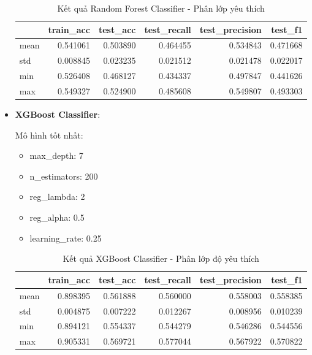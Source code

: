 \begin{itemize}
            \begin{table}[htbp]
                \centering
                \caption{Kết quả Random Forest Classifier - Phân lớp yêu thích}
                \label{tab:mal-fav-RF}
                \begin{tabular}{lrrrrr}
                    \hline
                     & train\_acc & test\_acc & test\_recall & test\_precision & test\_f1 \\
                    \hline
                    mean & 0.541061 & 0.503890 & 0.464455 & 0.534843 & 0.471668 \\
                    std & 0.008845 & 0.023235 & 0.021512 & 0.021478 & 0.022017 \\
                    min & 0.526408 & 0.468127 & 0.434337 & 0.497847 & 0.441626 \\
                    max & 0.549327 & 0.524900 & 0.485608 & 0.549807 & 0.493303 \\
                    \hline
                \end{tabular}
            \end{table}
            
            \FloatBarrier

        \item \textbf{XGBoost Classifier}:
        
            Mô hình tốt nhất:
            \begin{itemize}
                \item max\_depth: 7
                \item n\_estimators: 200
                \item reg\_lambda: 2
                \item reg\_alpha: 0.5
                \item learning\_rate: 0.25
            \end{itemize}

            \begin{table}[htbp]
                \centering
                \caption{Kết quả XGBoost Classifier - Phân lớp độ yêu thích}
                \label{tab:mal-fav-XGBC}
                \begin{tabular}{lrrrrr}
                \hline
                 & train\_acc & test\_acc & test\_recall & test\_precision & test\_f1  \\
                \hline
                mean & 0.898395 & 0.561888 & 0.560000 & 0.558003 & 0.558385 \\
                std & 0.004875 & 0.007222 & 0.012267 & 0.008956 & 0.010239 \\
                min & 0.894121 & 0.554337 & 0.544279 & 0.546286 & 0.544556 \\
                max & 0.905331 & 0.569721 & 0.577044 & 0.567922 & 0.570822 \\
                \hline
                \end{tabular}
            \end{table}

            \FloatBarrier
    \end{itemize}

